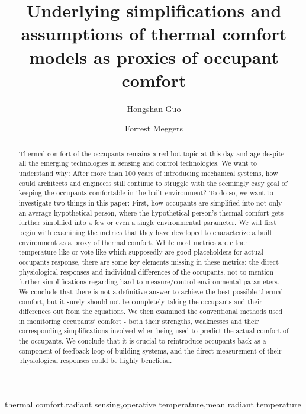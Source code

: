 \documentclass[review]{elsarticle}
\begin{document}
\begin{frontmatter}
\title{Underlying simplifications and assumptions of thermal comfort models as proxies of occupant comfort}
\author[mymainaddress]{Hongshan Guo}
\author[mymainaddress,mysecondaryaddress]{Forrest Meggers}
\address[mymainaddress]{School of Architecture, Princeton University, USA}
\address[mysecondaryaddress]{Andlinger Center for Energy and the Environment, Princeton University, USA.}
\begin{abstract}
Thermal comfort of the occupants remains a red-hot topic at this day and age despite all the emerging technologies in sensing and control technologies. We want to understand why: After more than 100 years of introducing mechanical systems, how could architects and engineers still continue to struggle with the seemingly easy goal of keeping the occupants comfortable in the built environment? To do so, we want to investigate two things in this paper: First, how occupants are simplified into not only an average hypothetical person, where the hypothetical person's thermal comfort gets further simplified into a few or even a single environmental parameter. 
We will first begin with examining the metrics that they have developed to characterize a built environment as a proxy of thermal comfort. 
While most metrics are either temperature-like or vote-like which supposedly are good placeholders for actual occupants response, there are some key elements missing in these metrics: the direct physiological responses and individual differences of the occupants, not to mention further simplifications regarding hard-to-measure/control environmental parameters.
We conclude that there is not a definitive answer to achieve the best possible thermal comfort, but it surely should not be completely taking the occupants and their differences out from the equations.
We then examined the conventional methods used in monitoring occupants' comfort - both their strengths, weaknesses and their corresponding simplifications involved when being used to predict the actual comfort of the occupants. We conclude that it is crucial to reintroduce occupants back as a component of feedback loop of building systems, and the direct measurement of their physiological responses could be highly beneficial.


\end{abstract}
\begin{keyword}thermal comfort\sep radiant sensing\sep operative temperature\sep mean radiant temperature\end{keyword}\end{frontmatter}
\tableofcontents
\end{document}

